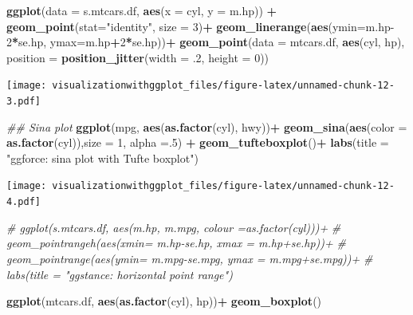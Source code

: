 \documentclass[]{krantz}
\makeatletter
\newenvironment{Shaded}{\begin{snugshade}}{\end{snugshade}}
\newcommand{\CommentTok}[1]{\textcolor[rgb]{0.56,0.35,0.01}{\textit{#1}}}
\newcommand{\DataTypeTok}[1]{\textcolor[rgb]{0.13,0.29,0.53}{#1}}
\newcommand{\DecValTok}[1]{\textcolor[rgb]{0.00,0.00,0.81}{#1}}
\newcommand{\FloatTok}[1]{\textcolor[rgb]{0.00,0.00,0.81}{#1}}
\newcommand{\KeywordTok}[1]{\textcolor[rgb]{0.13,0.29,0.53}{\textbf{#1}}}
\newcommand{\NormalTok}[1]{#1}
\newcommand{\OperatorTok}[1]{\textcolor[rgb]{0.81,0.36,0.00}{\textbf{#1}}}
\newcommand{\StringTok}[1]{\textcolor[rgb]{0.31,0.60,0.02}{#1}}
\newenvironment{kframe}{%
\medskip{}
\setlength{\fboxsep}{.8em}
 \def\at@end@of@kframe{}%
 \ifinner\ifhmode%
  \def\at@end@of@kframe{\end{minipage}}%
  \begin{minipage}{\columnwidth}%
 \fi\fi%
 \def\FrameCommand##1{\hskip\@totalleftmargin \hskip-\fboxsep
 \colorbox{shadecolor}{##1}\hskip-\fboxsep
     \hskip-\linewidth \hskip-\@totalleftmargin \hskip\columnwidth}%
 \MakeFramed {\advance\hsize-\width
   \@totalleftmargin\z@ \linewidth\hsize
   \@setminipage}}%
 {\par\unskip\endMakeFramed%
 \at@end@of@kframe}
\renewenvironment{Shaded}{\begin{kframe}}{\end{kframe}}
\makeatother
\begin{document}
\begin{Shaded}
\begin{Highlighting}[]
\KeywordTok{ggplot}\NormalTok{(}\DataTypeTok{data =}\NormalTok{ s.mtcars.df, }\KeywordTok{aes}\NormalTok{(}\DataTypeTok{x =}\NormalTok{ cyl, }\DataTypeTok{y =}\NormalTok{ m.hp)) }\OperatorTok{+}
\StringTok{  }\KeywordTok{geom_point}\NormalTok{(}\DataTypeTok{stat=}\StringTok{"identity"}\NormalTok{, }\DataTypeTok{size =} \DecValTok{3}\NormalTok{)}\OperatorTok{+}
\StringTok{  }\KeywordTok{geom_linerange}\NormalTok{(}\KeywordTok{aes}\NormalTok{(}\DataTypeTok{ymin=}\NormalTok{m.hp}\DecValTok{-2}\OperatorTok{*}\NormalTok{se.hp, }\DataTypeTok{ymax=}\NormalTok{m.hp}\OperatorTok{+}\DecValTok{2}\OperatorTok{*}\NormalTok{se.hp))}\OperatorTok{+}
\StringTok{  }\KeywordTok{geom_point}\NormalTok{(}\DataTypeTok{data =}\NormalTok{ mtcars.df, }\KeywordTok{aes}\NormalTok{(cyl, hp), }\DataTypeTok{position =} \KeywordTok{position_jitter}\NormalTok{(}\DataTypeTok{width =} \FloatTok{.2}\NormalTok{, }\DataTypeTok{height =} \DecValTok{0}\NormalTok{))}
\end{Highlighting}
\end{Shaded}

\texttt{[image: visualizationwithggplot\_files/figure-latex/unnamed-chunk-12-3.pdf]}

\begin{Shaded}
\begin{Highlighting}[]
\CommentTok{## Sina plot}
\KeywordTok{ggplot}\NormalTok{(mpg, }\KeywordTok{aes}\NormalTok{(}\KeywordTok{as.factor}\NormalTok{(cyl), hwy))}\OperatorTok{+}
\StringTok{ }\KeywordTok{geom_sina}\NormalTok{(}\KeywordTok{aes}\NormalTok{(}\DataTypeTok{color =} \KeywordTok{as.factor}\NormalTok{(cyl)),}\DataTypeTok{size =} \DecValTok{1}\NormalTok{, }\DataTypeTok{alpha =}\NormalTok{.}\DecValTok{5}\NormalTok{) }\OperatorTok{+}
\StringTok{ }\KeywordTok{geom_tufteboxplot}\NormalTok{()}\OperatorTok{+}
\StringTok{  }\KeywordTok{labs}\NormalTok{(}\DataTypeTok{title =} \StringTok{"ggforce: sina plot with Tufte boxplot"}\NormalTok{)}
\end{Highlighting}
\end{Shaded}

\texttt{[image: visualizationwithggplot\_files/figure-latex/unnamed-chunk-12-4.pdf]}

\begin{Shaded}
\begin{Highlighting}[]
\CommentTok{# ggplot(s.mtcars.df, aes(m.hp, m.mpg, colour =as.factor(cyl)))+}
\CommentTok{# geom_pointrangeh(aes(xmin= m.hp-se.hp, xmax = m.hp+se.hp))+}
\CommentTok{#   geom_pointrange(aes(ymin= m.mpg-se.mpg, ymax = m.mpg+se.mpg))+}
\CommentTok{#   labs(title = "ggstance: horizontal point range")}

\KeywordTok{ggplot}\NormalTok{(mtcars.df, }\KeywordTok{aes}\NormalTok{(}\KeywordTok{as.factor}\NormalTok{(cyl), hp))}\OperatorTok{+}
\KeywordTok{geom_boxplot}\NormalTok{()}
\end{Highlighting}
\end{Shaded}
\end{document}
